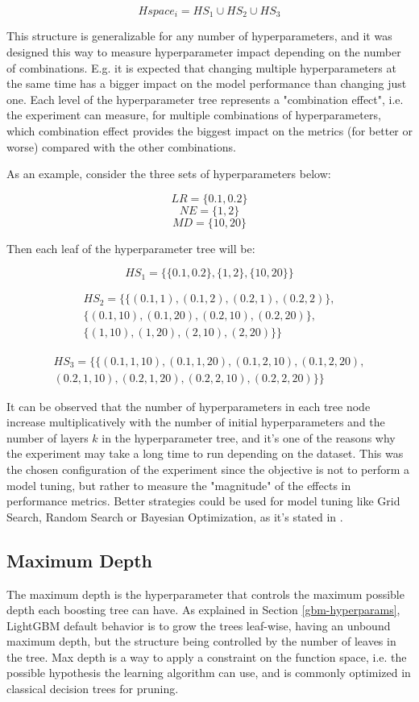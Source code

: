 $$Hspace_i = HS_1 \cup HS_2 \cup HS_3$$

This structure is generalizable for any number of hyperparameters, and it was designed this way to measure hyperparameter impact depending on the number of combinations. E.g. it is expected that changing multiple hyperparameters at the same time has a bigger impact on the model performance than changing just one. Each level of the hyperparameter tree represents a "combination effect", i.e. the experiment can measure, for multiple combinations of hyperparameters, which combination effect provides the biggest impact on the metrics (for better or worse) compared with the other combinations.

As an example, consider the three sets of hyperparameters below:

$$LR = \{0.1, 0.2\}$$
$$NE = \{1, 2\}$$
$$MD = \{10, 20\}$$

Then each leaf of the hyperparameter tree will be:

$$HS_1 = \Big\{\{0.1, 0.2\}, \{1, 2\}, \{10, 20\}\Big\}$$

\begin{align*}
    HS_2 = \Big\{\{(0.1, 1), (0.1, 2), (0.2, 1), (0.2, 2)\}, \\
            \{(0.1, 10), (0.1, 20), (0.2, 10), (0.2, 20)\}, \\
            \{(1, 10), (1, 20), (2, 10), (2, 20)\}\Big\}
\end{align*}

\begin{align*}
    HS_3 = \Big\{\{(0.1, 1, 10), (0.1, 1, 20), (0.1, 2, 10), (0.1, 2, 20), \\
    (0.2, 1, 10), (0.2, 1, 20), (0.2, 2, 10), (0.2, 2, 20)\}\Big\}
\end{align*}

It can be observed that the number of hyperparameters in each tree node increase multiplicatively with the number of initial hyperparameters and the number of layers $k$ in the hyperparameter tree, and it's one of the reasons why the experiment may take a long time to run depending on the dataset. This was the chosen configuration of the experiment since the objective is not to perform a model tuning, but rather to measure the "magnitude" of the effects in performance metrics. Better strategies could be used for model tuning like Grid Search, Random Search or Bayesian Optimization, as it's stated in \cite{probst2018tunability}.

\subsection{Maximum Depth}
\label{subsec:max-depth}
The maximum depth is the hyperparameter that controls the maximum possible depth each boosting tree can have. As explained in Section \ref{gbm-hyperparams}, LightGBM default behavior is to grow the trees leaf-wise, having an unbound maximum depth, but the structure being controlled by the number of leaves in the tree. Max depth is a way to apply a constraint on the function space, i.e. the possible hypothesis the learning algorithm can use, and is commonly optimized in classical decision trees for pruning. 

